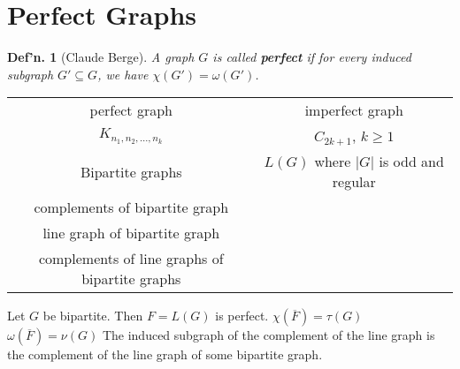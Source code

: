\documentclass[12pt, a4paper]{book}
\newtheorem{definition}[theorem]{Def'n.}
\theoremstyle{nonumberplain}
\begin{document}
\section{Perfect Graphs}
\begin{definition}[Claude Berge]
    A graph $G$ is called \textbf{perfect} if for every induced subgraph $G'\subseteq G$, we have $\chi(G')=\omega(G')$.
\end{definition}
\begin{tabular}{c|c}
    perfect graph & imperfect graph\\
    $K_{n_1,n_2,\ldots,n_k}$ & $C_{2k+1}$, $k\geq 1$\\
    Bipartite graphs & $L(G)$ where $|G|$ is odd and regular\\
    complements of bipartite graph &\\
    line graph of bipartite graph &\\
    complements of line graphs of bipartite graphs
\end{tabular}
Let $G$ be bipartite.
Then $F=L(G)$ is perfect.
$\chi(\overline{F})=\tau(G)$
$\omega(\overline{F})=\nu(G)$
The induced subgraph of the complement of the line graph is the complement of the line graph of some bipartite graph.
\end{document}

